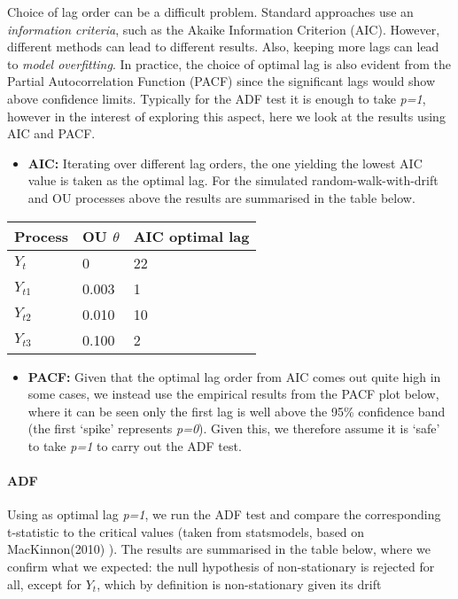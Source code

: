 \documentclass[11pt]{article}
\providecommand{\tightlist}{%
      \setlength{\itemsep}{0pt}\setlength{\parskip}{0pt}}
\begin{document}
    
Choice of lag order can be a difficult problem. Standard approaches use
an \emph{information criteria}, such as the Akaike Information Criterion
(AIC). However, different methods can lead to different results. Also,
keeping more lags can lead to \emph{model overfitting}. In practice, the
choice of optimal lag is also evident from the
Partial Autocorrelation Function \cite{PartialAutocorrelationFunction} (PACF) since the significant lags would show
above confidence limits.
Typically for the ADF test it is enough to take \emph{p=1}, however in
the interest of exploring this aspect, here we look at the results using
AIC and PACF.
\begin{itemize}
\tightlist
\item
  \textbf{AIC:} Iterating over different lag orders, the one yielding
  the lowest AIC value is taken as the optimal lag. For the simulated
  random-walk-with-drift and OU processes above the results are
  summarised in the table below.
\end{itemize}
    \begin{longtable}[]{@{}lll@{}}
\toprule
Process & OU $\theta$ & AIC optimal lag\tabularnewline
\midrule
\endhead
$Y_{t}$ & 0 & 22\tabularnewline
$Y_{t1}$ & 0.003 & 1\tabularnewline
$Y_{t2}$ & 0.010 & 10\tabularnewline
$Y_{t3}$ & 0.100 & 2\tabularnewline
\bottomrule
\end{longtable}
    \begin{itemize}
\tightlist
\item
  \textbf{PACF:} Given that the optimal lag order from AIC comes out
  quite high in some cases, we instead use the
  empirical results from the PACF plot below, where it can be seen only the first lag is well above the 95\% confidence band (the
  first `spike' represents \emph{p=0}). Given this, we therefore assume
  it is `safe' to take \emph{p=1} to carry out the ADF test.
\end{itemize}
    \begin{center}
    \end{center}
    
    \paragraph{ADF}\label{adf}
    
Using as optimal lag \emph{p=1}, we run the ADF test and compare the
corresponding t-statistic to the critical values (taken from
statsmodels, based on
MacKinnon(2010) \cite{MacKinnon(2010)}). The results are summarised in the table below, where we confirm what we expected: the null hypothesis of non-stationary is rejected for all, except for $Y_t$, which by definition is non-stationary given its drift
\end{document}
